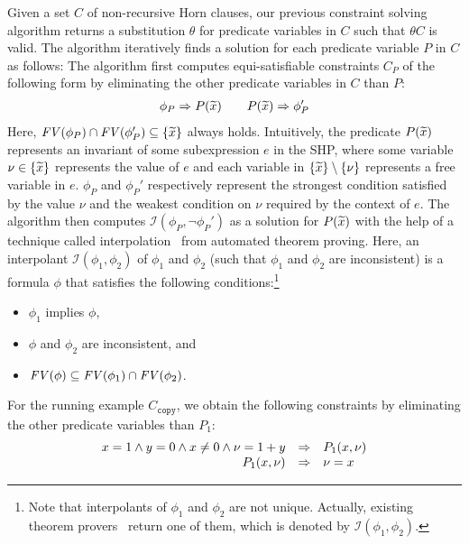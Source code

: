 Given a set \(C\) of non-recursive Horn clauses, our previous constraint
solving algorithm returns a substitution \(\theta\) for predicate
variables in \(C\) such that \(\theta C\) is valid.
The algorithm iteratively finds a solution for each predicate variable
\(P\) in \(C\) as follows:  The algorithm first computes equi-satisfiable
constraints \(C_P\) of the following form by eliminating the other
predicate variables in \(C\) than \(P\):
\begin{eqnarray*}
\phi_{P} \Rightarrow P(\widetilde{x}) \qquad
P(\widetilde{x}) \Rightarrow \phi_{P}'
\end{eqnarray*}
Here, \(\mathit{FV}({\phi_{P}}) \cap \mathit{FV}({\phi_{P}'}) \subseteq \{{\widetilde{x}}\}\)
always holds.  Intuitively, the predicate \(P(\widetilde{x})\) represents an
invariant of some subexpression \(e\) in the SHP, where some variable
\(\nu \in\{{\widetilde{x}}\}\) represents the value of \(e\) and each variable
in \(\{{\widetilde{x}}\} \setminus \{{\nu}\}\) represents a free variable in
\(e\).  \(\phi_P\) and \(\phi_{P}'\) respectively represent the
strongest condition satisfied by the value \(\nu\) and the weakest
condition on \(\nu\) required by the context of \(e\).
%
The algorithm then computes \(\mathcal{I}(\phi_P,\neg \phi_P')\) as a
solution for \(P(\widetilde{x})\) with the help of a technique called
interpolation~\cite{McMillan2005,Beyer2008} from automated theorem
proving.  Here, an interpolant \(\mathcal{I}(\phi_1,\phi_2)\) of
\(\phi_1\) and \(\phi_2\) (such that \(\phi_1\) and \(\phi_2\) are
inconsistent) is a formula \(\phi\) that satisfies the following
conditions:\footnote{Note that interpolants of \(\phi_1\) and \(\phi_2\)
are not unique.  Actually, existing theorem
provers~\cite{McMillan2005,Beyer2008} return one of them, which is
denoted by \(\mathcal{I}(\phi_1,\phi_2)\).}
\vspace{-5pt}
\begin{itemize}
\item \(\phi_1\) implies \(\phi\),
\item \(\phi\) and \(\phi_2\) are inconsistent, and
\item \(\mathit{FV}({\phi}) \subseteq \mathit{FV}({\phi_1}) \cap \mathit{FV}({\phi_2})\).
\end{itemize}
\vspace{-3pt}
%
For the running example \(C_{\texttt{copy}}\), we obtain the following
constraints by eliminating the other predicate variables than \(P_1\):
\[
\begin{array}{rcl}
x=1 \land y=0 \land x\neq0 \land \nu=1+y &\Rightarrow& P_1(x,\nu) \\
P_1(x,\nu) &\Rightarrow& \nu=x
\end{array}
\]
